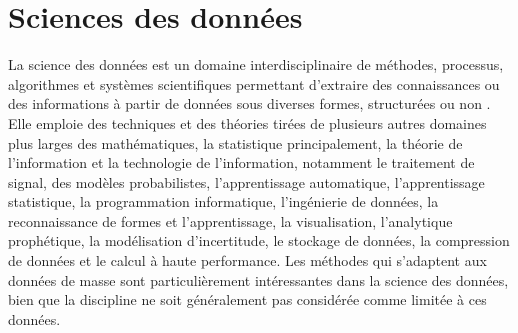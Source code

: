 \documentclass[12pt, french]{report}
\begin{document}
\section{Sciences des données}

La science des données est un domaine interdisciplinaire de méthodes, processus, algorithmes et systèmes scientifiques permettant d'extraire des connaissances ou des informations à partir de données sous diverses formes, structurées ou non \cite{key5}. Elle emploie des techniques et des théories tirées de plusieurs autres domaines plus larges des mathématiques, la statistique principalement, la théorie de l'information et la technologie de l'information, notamment le traitement de signal, des modèles probabilistes, l'apprentissage automatique, l'apprentissage statistique, la programmation informatique, l'ingénierie de données, la reconnaissance de formes et l'apprentissage, la visualisation, l'analytique prophétique, la modélisation d'incertitude, le stockage de données, la compression de données et le calcul à haute performance. Les méthodes qui s'adaptent aux données de masse sont particulièrement intéressantes dans la science des données, bien que la discipline ne soit généralement pas considérée comme limitée à ces données.\\
	
\end{document}
